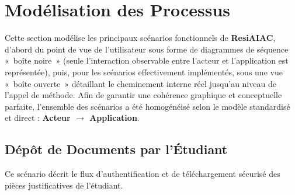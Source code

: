 \documentclass[a4paper,12pt]{article}
\begin{document}
\newpage

\section{Modélisation des Processus}

Cette section modélise les principaux scénarios fonctionnels de \textbf{ResiAIAC}, d'abord du point de vue de l'utilisateur sous forme de diagrammes de séquence «~boîte noire~» (seule l'interaction observable entre l'acteur et l'application est représentée), puis, pour les scénarios effectivement implémentés, sous une vue «~boîte ouverte~» détaillant le cheminement interne réel jusqu'au niveau de l'appel de méthode.
Afin de garantir une cohérence graphique et conceptuelle parfaite, l'ensemble des scénarios a été homogénéisé selon le modèle standardisé et direct : \textbf{Acteur $\rightarrow$ Application}.

\subsection{Dépôt de Documents par l'Étudiant}
Ce scénario décrit le flux d'authentification et de téléchargement sécurisé des pièces justificatives de l'étudiant.
\end{document}
